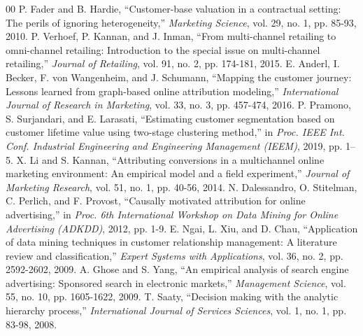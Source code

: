 \documentclass[conference]{IEEEtran}
\begin{document}
\begin{thebibliography}{00}
 P. Fader and B. Hardie, ``Customer-base valuation in a contractual setting: The perils of ignoring heterogeneity,'' \textit{Marketing Science}, vol. 29, no. 1, pp. 85-93, 2010.
 P. Verhoef, P. Kannan, and J. Inman, ``From multi-channel retailing to omni-channel retailing: Introduction to the special issue on multi-channel retailing,'' \textit{Journal of Retailing}, vol. 91, no. 2, pp. 174-181, 2015.
 E. Anderl, I. Becker, F. von Wangenheim, and J. Schumann, ``Mapping the customer journey: Lessons learned from graph-based online attribution modeling,'' \textit{International Journal of Research in Marketing}, vol. 33, no. 3, pp. 457-474, 2016.
 P. Pramono, S. Surjandari, and E. Larasati, ``Estimating customer segmentation based on customer lifetime value using two-stage clustering method,'' in \textit{Proc. IEEE Int. Conf. Industrial Engineering and Engineering Management (IEEM)}, 2019, pp. 1–5.
 X. Li and S. Kannan, ``Attributing conversions in a multichannel online marketing environment: An empirical model and a field experiment,'' \textit{Journal of Marketing Research}, vol. 51, no. 1, pp. 40-56, 2014.
 N. Dalessandro, O. Stitelman, C. Perlich, and F. Provost, ``Causally motivated attribution for online advertising,'' in \textit{Proc. 6th International Workshop on Data Mining for Online Advertising (ADKDD)}, 2012, pp. 1-9.
 E. Ngai, L. Xiu, and D. Chau, ``Application of data mining techniques in customer relationship management: A literature review and classification,'' \textit{Expert Systems with Applications}, vol. 36, no. 2, pp. 2592-2602, 2009.
 A. Ghose and S. Yang, ``An empirical analysis of search engine advertising: Sponsored search in electronic markets,'' \textit{Management Science}, vol. 55, no. 10, pp. 1605-1622, 2009.
 T. Saaty, ``Decision making with the analytic hierarchy process,'' \textit{International Journal of Services Sciences}, vol. 1, no. 1, pp. 83-98, 2008.
\end{thebibliography}
\end{document}

